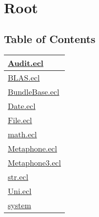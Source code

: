 \chapter*{Root}
\hypertarget{ecldoc:toc:root}{}


\section*{Table of Contents}
{\renewcommand{\arraystretch}{1.5}
\begin{longtable}{|p{\textwidth}|}
\hline
\hyperlink{ecldoc:toc:Audit}{Audit.ecl} \\
\hline
\hyperlink{ecldoc:toc:BLAS}{BLAS.ecl} \\
\hline
\hyperlink{ecldoc:toc:BundleBase}{BundleBase.ecl} \\
\hline
\hyperlink{ecldoc:toc:Date}{Date.ecl} \\
\hline
\hyperlink{ecldoc:toc:File}{File.ecl} \\
\hline
\hyperlink{ecldoc:toc:math}{math.ecl} \\
\hline
\hyperlink{ecldoc:toc:Metaphone}{Metaphone.ecl} \\
\hline
\hyperlink{ecldoc:toc:Metaphone3}{Metaphone3.ecl} \\
\hline
\hyperlink{ecldoc:toc:str}{str.ecl} \\
\hline
\hyperlink{ecldoc:toc:Uni}{Uni.ecl} \\
\hline
\hyperlink{ecldoc:toc:system}{system} \\
\hline
\end{longtable}
}












